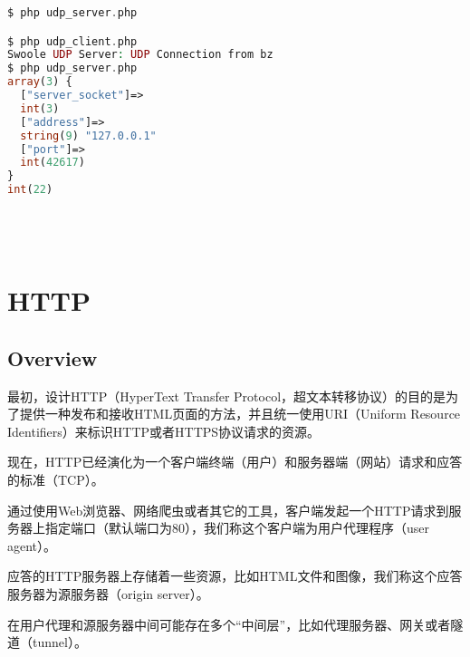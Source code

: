 \begin{lstlisting}[language=PHP]
$ php udp_server.php

$ php udp_client.php
Swoole UDP Server: UDP Connection from bz
$ php udp_server.php
array(3) {
  ["server_socket"]=>
  int(3)
  ["address"]=>
  string(9) "127.0.0.1"
  ["port"]=>
  int(42617)
}
int(22)
\end{lstlisting}




\begin{lstlisting}[language=PHP]

\end{lstlisting}




\begin{lstlisting}[language=PHP]

\end{lstlisting}




\begin{lstlisting}[language=PHP]

\end{lstlisting}




\begin{lstlisting}[language=PHP]

\end{lstlisting}





\chapter{HTTP}


\section{Overview}

最初，设计HTTP（HyperText Transfer Protocol，超文本转移协议）的目的是为了提供一种发布和接收HTML页面的方法，并且统一使用URI（Uniform Resource Identifiers）来标识HTTP或者HTTPS协议请求的资源。


现在，HTTP已经演化为一个客户端终端（用户）和服务器端（网站）请求和应答的标准（TCP）。

\begin{compactitem}
\item 通过使用Web浏览器、网络爬虫或者其它的工具，客户端发起一个HTTP请求到服务器上指定端口（默认端口为80），我们称这个客户端为用户代理程序（user agent）。
\item 应答的HTTP服务器上存储着一些资源，比如HTML文件和图像，我们称这个应答服务器为源服务器（origin server）。
\item 在用户代理和源服务器中间可能存在多个“中间层”，比如代理服务器、网关或者隧道（tunnel）。
\end{compactitem}

